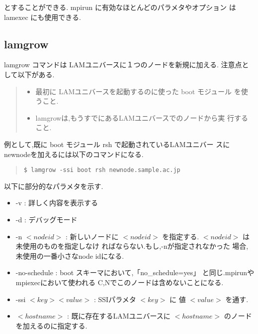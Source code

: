 \documentclass[a4paper,titlepage]{jreport}
\begin{document}
とすることができる. mpirun に有効なほとんどのパラメタやオプション
は lamexec にも使用できる.

\subsection{lamgrow}
lamgrow コマンドは LAMユニバースに１つのノードを新規に加える.
注意点として以下がある.

\begin{quote}
\begin{screen}
\begin{itemize}
\item 最初に LAMユニバースを起動するのに使った boot モジュール
      を使うこと.
\item lamgrowは,もうすでにあるLAMユニバースでのノードから実
      行すること.
\end{itemize}
\end{screen}
\end{quote}

例として,既に boot モジュール rsh で起動されているLAMユニバー
スに newnodeを加えるには以下のコマンドになる.

\begin{quote}
\begin{screen}
\begin{verbatim}
$ lamgrow -ssi boot rsh newnode.sample.ac.jp
\end{verbatim}
\end{screen}
\end{quote}

以下に部分的なパラメタを示す.

\begin{itemize}
\item -v : 詳しく内容を表示する
\item -d : デバッグモード
\item -n $< node id >$ : 新しいノードに $< node id >$ を指定する.
                       $< node id >$ は未使用のものを指定しなけ
                       ればならない.もし,-nが指定されなかった
                       場合,未使用の一番小さなnode idになる.
\item -no-schedule : boot スキーマにおいて,「no\_schedule=yes」
                     と同じ.mpirunやmpiexecにおいて使われる
                     C,Nでこのノードは含めないことになる.
\item -ssi $< key > < value >$ : SSIパラメタ $< key >$ に
                                 値 $< value >$ を通す.
\item $< hostname >$ : 既に存在するLAMユニバースに $< hostname >$
                     のノードを加えるのに指定する.
\end{itemize}
\end{document}
